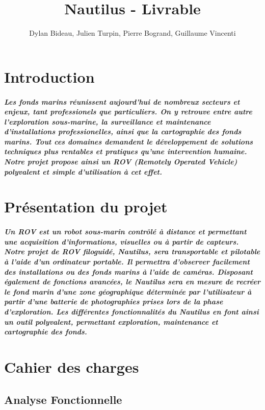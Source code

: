 \documentclass[a4paper,11pt]{report}
\author{Dylan Bideau, Julien Turpin, Pierre Bogrand, Guillaume Vincenti}
\title{Nautilus - Livrable}
\begin{document}
\maketitle

\renewcommand{\contentsname}{Sommaire}
\tableofcontents

\chapter{Introduction}
        \paragraph{Les fonds marins réunissent aujourd'hui de nombreux secteurs et enjeux, tant professionels que particuliers. On y retrouve entre autre l'exploration sous-marine, la surveillance et maintenance d'installations professionelles, ainsi que la cartographie des fonds marins. Tout ces domaines demandent le développement de solutions techniques plus rentables et pratiques qu'une intervention humaine. Notre projet propose ainsi un ROV (Remotely Operated Vehicle) polyvalent et simple d'utilisation à cet effet.}

\chapter{Présentation du projet}
        \paragraph{Un ROV est un robot sous-marin contrôlé à distance et permettant une acquisition d'informations, visuelles ou à partir de capteurs. Notre projet de ROV filoguidé, Nautilus, sera transportable et pilotable à l'aide d'un ordinateur portable. Il permettra d'observer facilement des installations ou des fonds marins à l'aide de caméras. Disposant également de fonctions avancées, le Nautilus sera en mesure de recréer le fond marin d'une zone géographique déterminée par l'utilisateur à partir d'une batterie de photographies prises lors de la phase d'exploration. Les différentes fonctionnalités du Nautilus en font ainsi un outil polyvalent, permettant exploration, maintenance et cartographie des fonds.}
				
\chapter{Cahier des charges}
        \section{Analyse Fonctionnelle}
\end{document}
